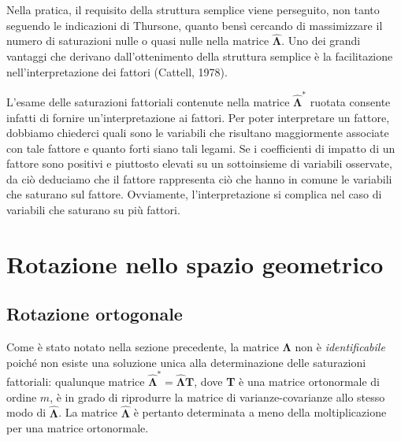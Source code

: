 Nella pratica, il requisito della struttura semplice viene perseguito, non tanto seguendo le indicazioni di Thursone, quanto bensì cercando di massimizzare il numero di saturazioni nulle o quasi nulle nella matrice  $\hat{\boldsymbol{\Lambda}}$.  Uno dei grandi vantaggi che derivano dall'ottenimento della struttura semplice è la facilitazione nell'interpretazione dei fattori (Cattell, 1978). 

L'esame delle saturazioni fattoriali contenute nella matrice
$\hat{\boldsymbol{\Lambda}}^*$ ruotata consente infatti di fornire
un'interpretazione ai fattori. 
Per poter interpretare un  fattore, dobbiamo chiederci quali sono le variabili
che risultano maggiormente associate con tale fattore e quanto forti
siano tali legami. Se i coefficienti di impatto di un fattore  sono positivi e
piuttosto elevati su un sottoinsieme di variabili osservate, da ciò
deduciamo che il fattore rappresenta ciò che hanno in comune le
variabili che saturano sul fattore.  Ovviamente, l'interpretazione si
complica nel caso di variabili che saturano su più fattori.  

\section{Rotazione nello spazio geometrico}


\subsection{Rotazione ortogonale}

Come è stato notato nella sezione precedente, la matrice
$\boldsymbol{\Lambda}$ non è \textit{identificabile} poiché non esiste
una soluzione unica alla determinazione delle saturazioni fattoriali: qualunque
matrice $\hat{\boldsymbol{\Lambda}}^* = \hat{\boldsymbol{\Lambda}}
\textbf{T}$, dove \textbf{T} è una matrice ortonormale di ordine $m$,
è in grado di riprodurre la matrice di varianze-covarianze allo stesso
modo di $\hat{\boldsymbol{\Lambda}}$. 
 La matrice
$\hat{\boldsymbol{\Lambda}}$ è pertanto determinata a meno della
moltiplicazione per una matrice ortonormale.

